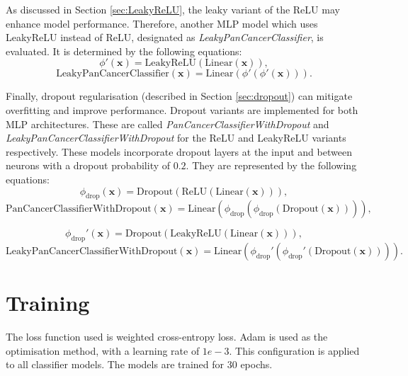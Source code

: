 \documentclass{l4proj}
\begin{document}
As discussed in Section \ref{sec:LeakyReLU}, the leaky variant of the ReLU may enhance model performance. Therefore, another MLP model which uses LeakyReLU instead of ReLU, designated as \emph{LeakyPanCancerClassifier}, is evaluated. It is determined by the following equations:
\begin{equation}
    \phi'(\boldsymbol{x}) = \text{LeakyReLU}(\text{Linear}(\boldsymbol{x})),
\end{equation}
\begin{equation}
    \text{LeakyPanCancerClassifier}(\boldsymbol{x}) = \text{Linear}(\phi'(\phi'(\boldsymbol{x}))).
\end{equation}

Finally, dropout regularisation (described in Section \ref{sec:dropout}) can mitigate overfitting and improve performance. Dropout variants are implemented for both MLP architectures. These are called \emph{PanCancerClassifierWithDropout} and \emph{LeakyPanCancerClassifierWithDropout} for the ReLU and LeakyReLU variants respectively. These models incorporate dropout layers at the input and between neurons with a dropout probability of $0.2$. They are represented by the following equations:
\begin{equation}
    \phi_\text{drop}(\boldsymbol{x}) = \text{Dropout}(\text{ReLU}(\text{Linear}(\boldsymbol{x}))),
\end{equation}
\begin{equation}
    \text{PanCancerClassifierWithDropout}(\boldsymbol{x}) = \text{Linear}(\phi_\text{drop}(\phi_\text{drop}(\text{Dropout}(\boldsymbol{x})))),
\end{equation}

\begin{equation}
    \phi_\text{drop}'(\boldsymbol{x}) = \text{Dropout}(\text{LeakyReLU}(\text{Linear}(\boldsymbol{x}))),
\end{equation}
\begin{equation}
    \text{LeakyPanCancerClassifierWithDropout}(\boldsymbol{x}) = \text{Linear}(\phi_\text{drop}'(\phi_\text{drop}'(\text{Dropout}(\boldsymbol{x})))).
\end{equation}

\section{Training} \label{sec:WSItraining}
The loss function used is weighted cross-entropy loss. Adam is used as the optimisation method, with a learning rate of $1e-3$. This configuration is applied to all classifier models. The models are trained for 30 epochs.
\end{document}
